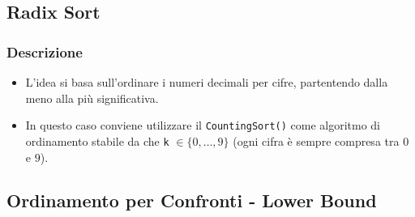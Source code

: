 \documentclass{article}
\begin{document}


\subsection{Radix Sort}

\subsubsection{Descrizione}

\begin{itemize}
    \item L'idea si basa sull'ordinare i numeri decimali per cifre, partentendo dalla meno alla più significativa.
    \item In questo caso conviene utilizzare il \verb|CountingSort()| come algoritmo di ordinamento stabile da che \verb|k| $\in \{0, \dots, 9\}$ (ogni cifra è sempre compresa tra $0$ e $9$).
\end{itemize}



\subsection{Ordinamento per Confronti - Lower Bound}
\end{document}
